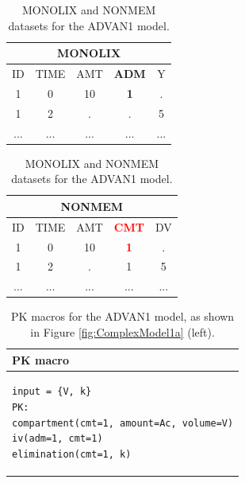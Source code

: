 \begin{table}[ht!]
\footnotesize
\parbox{.5\linewidth}{
\centering
\begin{tabular}{ccccc}
  \hline
   \multicolumn{5}{c}{\textbf{MONOLIX}} \\
  \hline
ID & TIME & AMT & \textbf{ADM} & Y  \\
  \hline
1  & 0        & 10   & \textbf{1} & .       \\
1  & 2        & .      & .   & 5      \\
... &  ...      &  ...   &  ...   & ...  \\
\end{tabular}
}
\hfill
\parbox{.5\linewidth}{
\centering
\begin{tabular}{ccccc}
  \hline
   \multicolumn{5}{c}{\textbf{NONMEM}} \\
  \hline
ID & TIME & AMT & \textbf{\textcolor{red}{CMT}} & DV \\
  \hline
1  & 0        & 10   & \textbf{\textcolor{red}{1}}   & .    \\
1  & 2        & .      & 1    & 5   \\
... &  ...      &  ...   &  ... & ...  \\
\end{tabular}
}
\caption{MONOLIX and NONMEM datasets for the ADVAN1 model.}
\end{table}


\begin{table}[h!]
\setlength{\tabcolsep}{15pt}
\begin{center}
\begin{tabular}{l}
  \hline \hline
PK macro \\[-.25ex]
  \hline
\lstset{language=NONMEMdataSet}
\begin{lstlisting}
input = {V, k}
PK:
compartment(cmt=1, amount=Ac, volume=V)
iv(adm=1, cmt=1)
elimination(cmt=1, k)
\end{lstlisting}
\\
  \hline
\end{tabular}
\caption{PK macros  for the ADVAN1 model, as shown in Figure \ref{fig:ComplexModel1a} (left).}
\label{tab:advan1Table}
\end{center}
\end{table}


